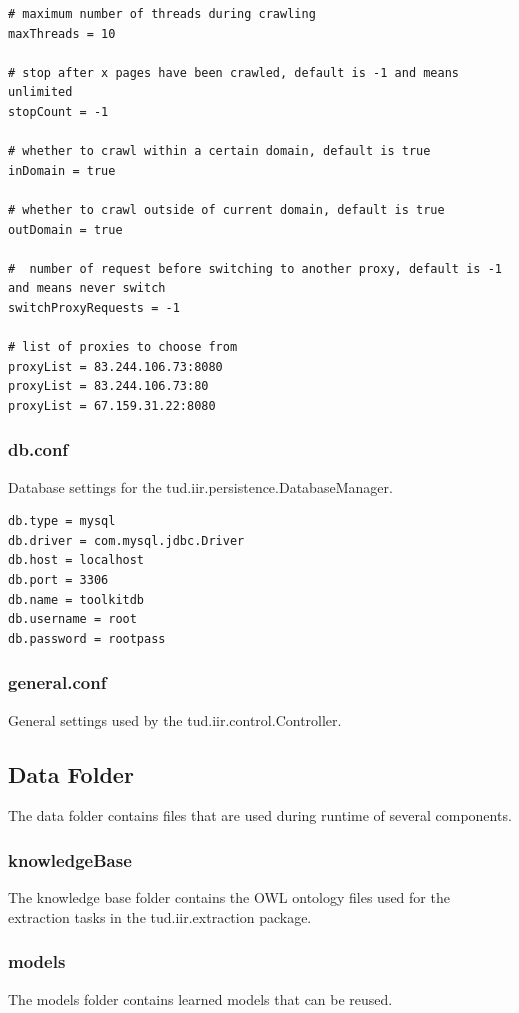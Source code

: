\documentclass[a4paper,twoside]{article}      %
\begin{document}
\begin{verbatim}
# maximum number of threads during crawling
maxThreads = 10

# stop after x pages have been crawled, default is -1 and means unlimited
stopCount = -1

# whether to crawl within a certain domain, default is true
inDomain = true
	
# whether to crawl outside of current domain, default is true
outDomain = true

#  number of request before switching to another proxy, default is -1 and means never switch
switchProxyRequests = -1
	
# list of proxies to choose from
proxyList = 83.244.106.73:8080
proxyList = 83.244.106.73:80
proxyList = 67.159.31.22:8080
\end{verbatim}

\subsubsection{db.conf}
Database settings for the tud.iir.persistence.DatabaseManager.

\begin{verbatim}
db.type = mysql
db.driver = com.mysql.jdbc.Driver
db.host = localhost
db.port = 3306
db.name = toolkitdb
db.username = root
db.password = rootpass
\end{verbatim}

\subsubsection{general.conf}
General settings used by the tud.iir.control.Controller.

\subsection{Data Folder}
The data folder contains files that are used during runtime of several components.

\subsubsection{knowledgeBase} 
The knowledge base folder contains the OWL ontology files used for the extraction tasks in the tud.iir.extraction package.

\subsubsection{models}
The models folder contains learned models that can be reused.
\end{document}
